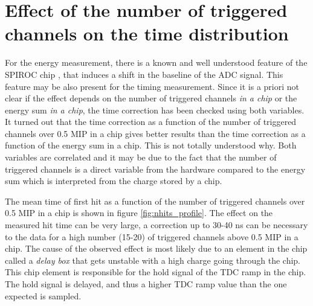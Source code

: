 \section{Effect of the number of triggered channels on the time distribution}
\label{subsec:ped_shift}

For the energy measurement, there is a known and well understood feature of the SPIROC chip \cite{Hartbrich2012}, that induces a shift in the baseline of the ADC signal. This feature may be also present for the timing measurement. Since it is a priori not clear if the effect depends on the number of triggered channels \textit{in a chip} or the energy sum \textit{in a chip}, the time correction has been checked using both variables. It turned out that the time correction as a function of the number of triggered channels over 0.5 MIP in a chip gives better results than the time correction as a function of the energy sum in a chip. This is not totally understood why. Both variables are correlated and it may be due to the fact that the number of triggered channels is a direct variable from the hardware compared to the energy sum which is interpreted from the charge stored by a chip.%

The mean time of first hit as a function of the number of triggered channels over 0.5 MIP in a chip is shown in figure \ref{fig:nhits_profile}. The effect on the measured hit time can be very large, a correction up to 30-40 ns can be necessary to the data for a high number (15-20) of triggered channels above 0.5 MIP in a chip. The cause of the observed effect is most likely due to an element in the chip called a \textit{delay box} that gets unstable with a high charge going through the chip. This chip element is responsible for the hold signal of the TDC ramp in the chip. The hold signal is delayed, and thus a higher TDC ramp value than the one expected is sampled.

